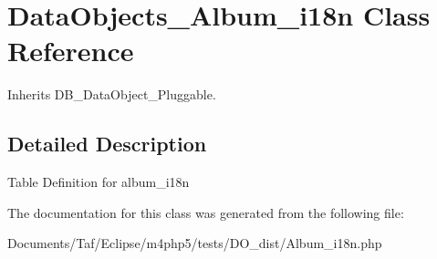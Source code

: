 \hypertarget{classDataObjects__Album__i18n}{
\section{DataObjects\_\-Album\_\-i18n Class Reference}
\label{classDataObjects__Album__i18n}
}
Inherits DB\_\-DataObject\_\-Pluggable.



\subsection{Detailed Description}
Table Definition for album\_\-i18n 

The documentation for this class was generated from the following file:\begin{CompactItemize}
\item 
Documents/Taf/Eclipse/m4php5/tests/DO\_\-dist/Album\_\-i18n.php\end{CompactItemize}
